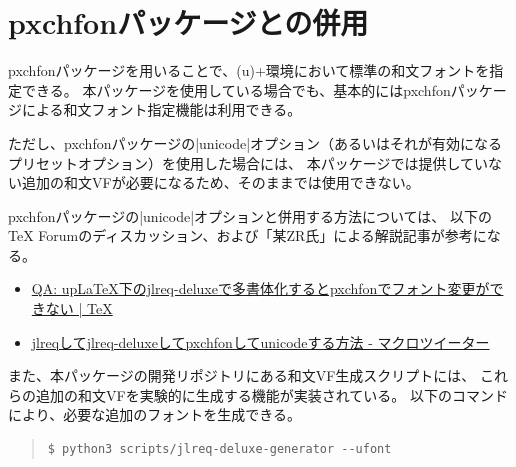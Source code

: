 \documentclass[dvipdfmx,a4paper]{jlreq}
\newcommand{\pkg}[1]{\textsf{#1}}
\begin{document}
\section{\pkg{pxchfon}パッケージとの併用}

\pkg{pxchfon}パッケージを用いることで、(u)\pLaTeX{}+\DVIPDFMx{}環境において標準の和文フォントを指定できる。
本パッケージを使用している場合でも、基本的には\pkg{pxchfon}パッケージによる和文フォント指定機能は利用できる。

ただし、\pkg{pxchfon}パッケージの|unicode|オプション（あるいはそれが有効になるプリセットオプション）を使用した場合には、
本パッケージでは提供していない追加の和文VFが必要になるため、そのままでは使用できない。

\pkg{pxchfon}パッケージの|unicode|オプションと併用する方法については、
以下のTeX Forumのディスカッション、および「某ZR氏」による解説記事が参考になる。
\begin{itemize}
\item \href{https://okumuralab.org/tex/mod/forum/discuss.php?d=3993}%
        {QA: upLaTeX下のjlreq-deluxeで多書体化するとpxchfonでフォント変更ができない \string| TeX}%
\item \href{https://zrbabbler.hatenablog.com/entry/2025/09/07/175419}%
        {jlreqしてjlreq-deluxeしてpxchfonしてunicodeする方法 - マクロツイーター}%
\end{itemize}

また、本パッケージの開発リポジトリにある和文VF生成スクリプトには、
これらの追加の和文VFを実験的に生成する機能が実装されている。
以下のコマンドにより、必要な追加のフォントを生成できる。
\begin{quote}
\begin{verbatim}
$ python3 scripts/jlreq-deluxe-generator --ufont
\end{verbatim}
\end{quote}
\end{document}
